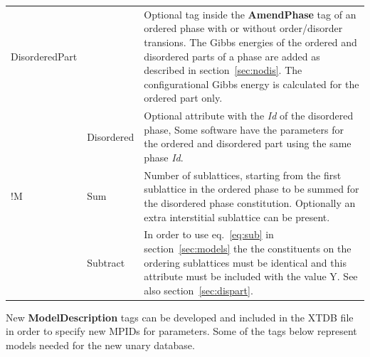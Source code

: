 \documentclass{article}
\begin{document}
\begin{tabular}{|p{} p{} p{}|}
  DisorderedPart & & Optional tag inside the {\bf AmendPhase} tag of an 
              ordered phase with or without order/disorder transions.
              The Gibbs energies of the ordered and disordered parts
              of a phase are added as described in  section~\ref{sec:nodis}.
              The configurational Gibbs energy is calculated for
              the ordered part only.  \\

   & Disordered & Optional attribute with the {\em Id} of the disordered phase, 
            Some software have the parameters for the ordered
            and disordered part using the same phase {\em Id}.\\

!M  & Sum &  Number of sublattices, starting from the first sublattice in the
             ordered phase to be summed for the disordered phase
             constitution.  Optionally an extra interstitial
             sublattice can be present.\\

   & Subtract & In order to use eq.~\ref{eq:sub} in
             section~\ref{sec:models} the the constituents on the
             ordering sublattices must be identical and this attribute
             must be included with the value Y.  See also
             section~\ref{sec:dispart}. \\\hline

\end{tabular}

\newpage

New {\bf ModelDescription} tags can be developed and included in the
XTDB file in order to specify new MPIDs for parameters.  Some of the
tags below represent models needed for the new unary database.
\end{document}
